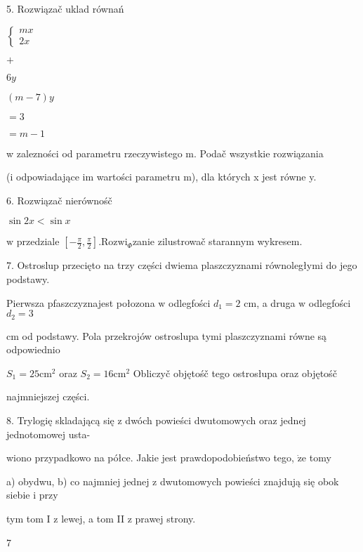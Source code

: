 \documentclass[a4paper,12pt]{article}
\begin{document}
5. Rozwiązač uklad równań

$\left\{\begin{array}{l}
mx\\
2x
\end{array}\right.$

$+$

$6y$

$(m-7)y$

$=3$

$=m-1$

w zalezności od parametru rzeczywistego m. Podač wszystkie rozwiązania

(i odpowiadające im wartości parametru m), dla których x jest równe y.

6. Rozwiązač nierównośč

$\sin 2x<\sin x$

$\mathrm{w}$ przedziale $[-\displaystyle \frac{\pi}{2},\frac{\pi}{2}]. \mathrm{R}\mathrm{o}\mathrm{z}\mathrm{w}\mathrm{i}_{\Phi}$zanie zilustrowač starannym wykresem.

7. Ostroslup przecięto na trzy części dwiema plaszczyznami równoległymi do jego podstawy.

Pierwsza pfaszczyznajest połozona $\mathrm{w}$ odlegfości $d_{1} =2$ cm, a druga $\mathrm{w}$ odlegfości $d_{2}=3$

cm od podstawy. Pola przekrojów ostroslupa tymi plaszczyznami równe są odpowiednio

$S_{1} = 25 \mathrm{c}\mathrm{m}^{2}$ oraz $S_{2} = 16 \mathrm{c}\mathrm{m}^{2}$ Obliczyč objętośč tego ostrosłupa oraz objętośč

najmniejszej części.

8. Trylogię skladającą się $\mathrm{z}$ dwóch powieści dwutomowych oraz jednej jednotomowej usta-

wiono przypadkowo na półce. Jakie jest prawdopodobieństwo tego, $\dot{\mathrm{z}}\mathrm{e}$ tomy

a) obydwu, b) co najmniej jednej $\mathrm{z}$ dwutomowych powieści znajdują się obok siebie $\mathrm{i}$ przy

tym tom I $\mathrm{z}$ lewej, a tom II $\mathrm{z}$ prawej strony.

7
\end{document}
